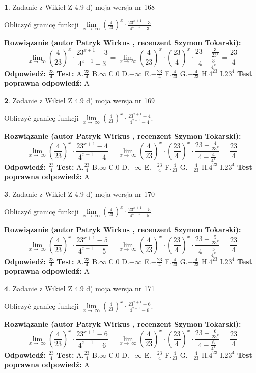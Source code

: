 \documentclass[12pt, a4paper]{article}
\theoremstyle{definition} %
\newtheorem{zad}{}
\newcommand{\zadStart}[1]{\begin{zad}#1\newline}
\newcommand{\zadStop}{\end{zad}}
\newcommand{\rozwStart}[2]{\noindent \textbf{Rozwiązanie (autor #1 , recenzent #2): }\newline}
\newcommand{\rozwStop}{\newline}
\newcommand{\odpStart}{\noindent \textbf{Odpowiedź:}\newline}
\newcommand{\odpStop}{\newline}
\newcommand{\testStart}{\noindent \textbf{Test:}\newline}
\newcommand{\testStop}{\newline}
\newcommand{\kluczStart}{\noindent \textbf{Test poprawna odpowiedź:}\newline}
\newcommand{\kluczStop}{\newline}
\begin{document}
\zadStart{Zadanie z Wikieł Z 4.9 d) moja wersja nr 168}


Obliczyć granicę funkcji  $\lim\limits_{x\to\ \infty}(\frac{4}{23})^{x}\cdot\frac{23^{x+1}-3}{4^{x+1}-3}$.
\zadStop
\rozwStart{Patryk Wirkus}{Szymon Tokarski}
$$\lim\limits_{x\to\ \infty}(\frac{4}{23})^{x}\cdot\frac{23^{x+1}-3}{4^{x+1}-3}=\lim\limits_{x\to\ \infty}(\frac{4}{23})^{x}\cdot(\frac{23}{4})^{x} \cdot \frac{23-\frac{3}{23^{x}}}{4-\frac{3}{4^{x}}} = \frac{23}{4}$$
\rozwStop
\odpStart
$\frac{23}{4}$
\odpStop
\testStart
A.$\frac{23}{4}$ B.$\infty$ C.$0$ D.$-\infty$ E.$-\frac{23}{4}$
F.$\frac{4}{23}$ G.$-\frac{4}{23}$
H.$4^{23}$
I.$23^{4}$
\testStop
\kluczStart
A
\kluczStop



\zadStart{Zadanie z Wikieł Z 4.9 d) moja wersja nr 169}


Obliczyć granicę funkcji  $\lim\limits_{x\to\ \infty}(\frac{4}{23})^{x}\cdot\frac{23^{x+1}-4}{4^{x+1}-4}$.
\zadStop
\rozwStart{Patryk Wirkus}{Szymon Tokarski}
$$\lim\limits_{x\to\ \infty}(\frac{4}{23})^{x}\cdot\frac{23^{x+1}-4}{4^{x+1}-4}=\lim\limits_{x\to\ \infty}(\frac{4}{23})^{x}\cdot(\frac{23}{4})^{x} \cdot \frac{23-\frac{4}{23^{x}}}{4-\frac{4}{4^{x}}} = \frac{23}{4}$$
\rozwStop
\odpStart
$\frac{23}{4}$
\odpStop
\testStart
A.$\frac{23}{4}$ B.$\infty$ C.$0$ D.$-\infty$ E.$-\frac{23}{4}$
F.$\frac{4}{23}$ G.$-\frac{4}{23}$
H.$4^{23}$
I.$23^{4}$
\testStop
\kluczStart
A
\kluczStop



\zadStart{Zadanie z Wikieł Z 4.9 d) moja wersja nr 170}


Obliczyć granicę funkcji  $\lim\limits_{x\to\ \infty}(\frac{4}{23})^{x}\cdot\frac{23^{x+1}-5}{4^{x+1}-5}$.
\zadStop
\rozwStart{Patryk Wirkus}{Szymon Tokarski}
$$\lim\limits_{x\to\ \infty}(\frac{4}{23})^{x}\cdot\frac{23^{x+1}-5}{4^{x+1}-5}=\lim\limits_{x\to\ \infty}(\frac{4}{23})^{x}\cdot(\frac{23}{4})^{x} \cdot \frac{23-\frac{5}{23^{x}}}{4-\frac{5}{4^{x}}} = \frac{23}{4}$$
\rozwStop
\odpStart
$\frac{23}{4}$
\odpStop
\testStart
A.$\frac{23}{4}$ B.$\infty$ C.$0$ D.$-\infty$ E.$-\frac{23}{4}$
F.$\frac{4}{23}$ G.$-\frac{4}{23}$
H.$4^{23}$
I.$23^{4}$
\testStop
\kluczStart
A
\kluczStop



\zadStart{Zadanie z Wikieł Z 4.9 d) moja wersja nr 171}


Obliczyć granicę funkcji  $\lim\limits_{x\to\ \infty}(\frac{4}{23})^{x}\cdot\frac{23^{x+1}-6}{4^{x+1}-6}$.
\zadStop
\rozwStart{Patryk Wirkus}{Szymon Tokarski}
$$\lim\limits_{x\to\ \infty}(\frac{4}{23})^{x}\cdot\frac{23^{x+1}-6}{4^{x+1}-6}=\lim\limits_{x\to\ \infty}(\frac{4}{23})^{x}\cdot(\frac{23}{4})^{x} \cdot \frac{23-\frac{6}{23^{x}}}{4-\frac{6}{4^{x}}} = \frac{23}{4}$$
\rozwStop
\odpStart
$\frac{23}{4}$
\odpStop
\testStart
A.$\frac{23}{4}$ B.$\infty$ C.$0$ D.$-\infty$ E.$-\frac{23}{4}$
F.$\frac{4}{23}$ G.$-\frac{4}{23}$
H.$4^{23}$
I.$23^{4}$
\testStop
\kluczStart
A
\kluczStop
\end{document}
